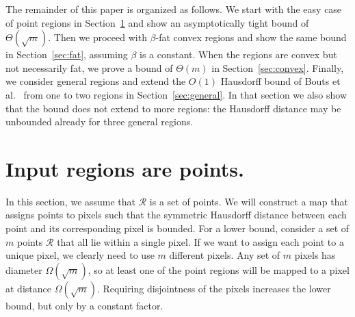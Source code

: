 \documentclass[a4paper, 11pt]{article}
\newcommand{\etal}{\textnormal{et al.}\xspace}
\begin{document}
The remainder of this paper is organized as follows. We start with the easy case of point regions in Section~\ref{sec:points} and show an asymptotically tight bound of $\Theta(\sqrt{m})$. Then we proceed with $\beta$-fat convex regions and show the same bound in
Section~\ref{sec:fat}, assuming $\beta$ is a constant. When the regions are convex but not necessarily fat, we prove a bound of $\Theta(m)$ in Section~\ref{sec:convex}. Finally, we consider general regions and extend the $O(1)$ Hausdorff bound of Bouts \etal~\cite{bouts2016mapping} from one to two regions
in Section~\ref{sec:general}. In that section we also show that the bound does not extend to more regions: the Hausdorff distance may be unbounded already for three general regions.





\section{Input regions are points.}
\label{sec:points}
In this section, we assume that $\mathcal{R}$ is a set of points. We will construct a map that assigns points to pixels such that the symmetric Hausdorff distance between each point and its corresponding pixel is bounded.
For a lower bound, consider a set of $m$ points $\mathcal{R}$ that all lie within a single pixel.
If we want to assign each point to a unique pixel, we clearly need to use $m$ different pixels. Any set of $m$ pixels has diameter $\Omega(\sqrt{m})$, so at least
one of the point regions will be mapped to a pixel at distance $\Omega(\sqrt{m})$. Requiring disjointness of the pixels increases the lower bound, but only by a constant factor.
\end{document}
